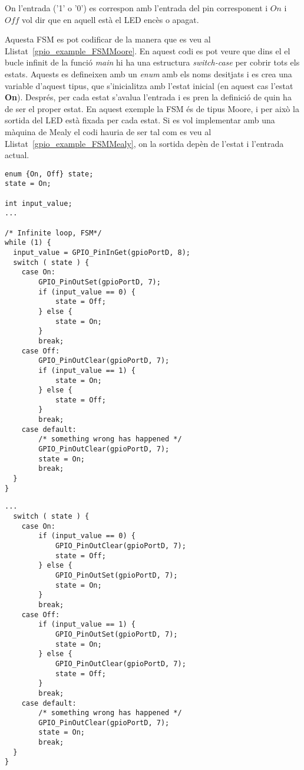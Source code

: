 On l'entrada ('1' o '0') es correspon amb l'entrada del pin corresponent i $On$ i $Off$ vol dir que en aquell està el LED encès o apagat. 

Aquesta FSM es pot codificar de la manera que es veu al Llistat~\ref{gpio_example_FSMMoore}. En aquest codi es pot veure que dins el el bucle infinit de la funció {\em main} hi ha una estructura {\em switch-case} per cobrir tots els estats. Aquests es defineixen amb un {\em enum} amb els noms desitjats i es crea una variable d'aquest tipus, que s'inicialitza amb l'estat inicial (en aquest cas l'estat {\bf On}). Després, per cada estat s'avalua l'entrada i es pren la definició de quin ha de ser el proper estat. En aquest exemple la FSM és de tipus Moore, i per això la sortida del LED està fixada per cada estat. Si es vol implementar amb una màquina de Mealy el codi hauria de ser tal com es veu al Llistat~\ref{gpio_example_FSMMealy}, on la sortida depèn de l'estat i l'entrada actual.

\begin{lstlisting}[style=customc,caption={Codi d'exemple de GPIO},label=gpio_example_FSMMoore]
enum {On, Off} state;
state = On;

int input_value;
...

/* Infinite loop, FSM*/
while (1) {
  input_value = GPIO_PinInGet(gpioPortD, 8);
  switch ( state ) {
    case On:
        GPIO_PinOutSet(gpioPortD, 7);
        if (input_value == 0) {
            state = Off;
        } else {
            state = On;
        }
        break;
    case Off:
        GPIO_PinOutClear(gpioPortD, 7);
        if (input_value == 1) {
            state = On;
        } else {
            state = Off;
        }
        break;
    case default:
        /* something wrong has happened */
        GPIO_PinOutClear(gpioPortD, 7);
        state = On;
        break;
  }
}
\end{lstlisting}


\begin{lstlisting}[style=customc,caption={Codi d'exemple de GPIO},label=gpio_example_FSMMealy]
...
  switch ( state ) {
    case On:
        if (input_value == 0) {
            GPIO_PinOutClear(gpioPortD, 7);
            state = Off;
        } else {
            GPIO_PinOutSet(gpioPortD, 7);
            state = On;
        }
        break;
    case Off:
        if (input_value == 1) {
            GPIO_PinOutSet(gpioPortD, 7);
            state = On;
        } else {
            GPIO_PinOutClear(gpioPortD, 7);
            state = Off;
        }
        break;
    case default:
        /* something wrong has happened */
        GPIO_PinOutClear(gpioPortD, 7);
        state = On;
        break;
  }
}
\end{lstlisting}

